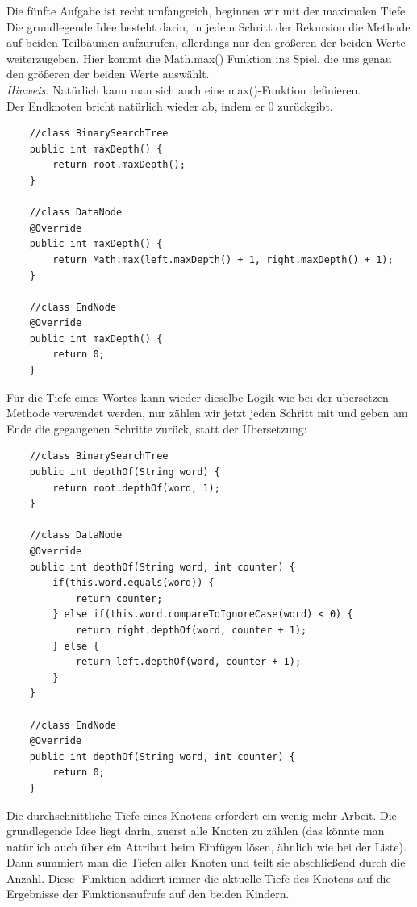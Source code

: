 \documentclass{article}
\begin{document}
Die fünfte Aufgabe ist recht umfangreich, beginnen wir mit der maximalen Tiefe. Die grundlegende Idee besteht darin, in jedem Schritt der Rekursion die Methode auf beiden Teilbäumen aufzurufen, allerdings nur den größeren der beiden Werte weiterzugeben. Hier kommt die Math.max() Funktion ins Spiel, die uns genau den größeren der beiden Werte auswählt. \\
\textit{Hinweis:} Natürlich kann man sich auch eine  max()-Funktion definieren. \\
Der Endknoten bricht natürlich wieder ab, indem er 0 zurückgibt. 
\begin{verbatim}
    //class BinarySearchTree
    public int maxDepth() {
        return root.maxDepth();
    }

    //class DataNode 
    @Override 
    public int maxDepth() {
        return Math.max(left.maxDepth() + 1, right.maxDepth() + 1);
    }

    //class EndNode 
    @Override 
    public int maxDepth() {
        return 0;
    }
\end{verbatim}
Für die Tiefe eines Wortes kann wieder dieselbe Logik wie bei der übersetzen-Methode verwendet werden, nur zählen wir jetzt jeden Schritt mit und geben am Ende die gegangenen Schritte zurück, statt der Übersetzung:
\begin{verbatim}
    //class BinarySearchTree
    public int depthOf(String word) {
        return root.depthOf(word, 1);
    }

    //class DataNode 
    @Override 
    public int depthOf(String word, int counter) {
        if(this.word.equals(word)) {
            return counter;
        } else if(this.word.compareToIgnoreCase(word) < 0) {
            return right.depthOf(word, counter + 1);
        } else {
            return left.depthOf(word, counter + 1);
        }
    } 

    //class EndNode 
    @Override 
    public int depthOf(String word, int counter) {
        return 0;
    }
\end{verbatim}
Die durchschnittliche Tiefe eines Knotens erfordert ein wenig mehr Arbeit. Die grundlegende Idee liegt darin, zuerst alle Knoten zu zählen (das könnte man natürlich auch über ein Attribut beim Einfügen lösen, ähnlich wie bei der Liste). Dann summiert man die Tiefen aller Knoten und teilt sie abschließend durch die Anzahl. Diese -Funktion addiert immer die aktuelle Tiefe des Knotens auf die Ergebnisse der Funktionsaufrufe auf den beiden Kindern. \\
\end{document}
